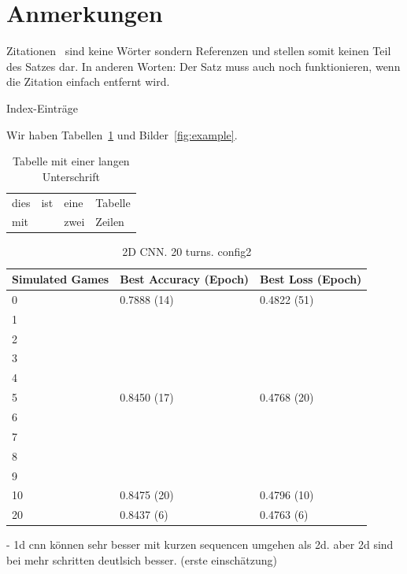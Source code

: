 \lipsum[1-3]

\section{Anmerkungen}
Zitationen~\cite{Rabiner89-ATO} sind keine Wörter sondern Referenzen und stellen somit keinen Teil des Satzes dar. In anderen Worten: Der Satz muss auch noch funktionieren, wenn die Zitation einfach entfernt wird.


Index-Einträge~

Wir haben Tabellen~\ref{tab:example} und Bilder~\ref{fig:example}.

\begin{table}
 \centering
 \begin{tabular}{llll}
  \toprule
  dies & ist & eine & Tabelle \\
  mit  &     & zwei & Zeilen \\
  \bottomrule
 \end{tabular}
 \caption[Tabelle mit kurzer Unterschrift]{Tabelle mit einer langen Unterschrift}
 \label{tab:example}
\end{table}

\begin{table}
	\centering
	\caption{2D CNN. 20 turns. config2}%
	\begin{tabular}{|l|l|l|}
		\hline
		Simulated Games & Best Accuracy (Epoch) & Best Loss (Epoch)\\
		\hline
		0 & 0.7888 (14) & 0.4822 (51) \\
		1 &  &  \\
		2 &  &  \\
		3 &  &  \\
		4 &  &  \\
		5 & 0.8450 (17) & 0.4768 (20) \\
		6 &  &  \\
		7 &  &  \\
		8 &  &  \\
		9 &  &  \\
		10 & 0.8475 (20) & 0.4796 (10) \\
		20 & 0.8437 (6) & 0.4763 (6) \\
		\hline
	\end{tabular}
\end{table}

- 1d cnn können sehr besser mit kurzen sequencen umgehen als 2d. aber 2d sind bei mehr schritten deutlsich besser. (erste einschätzung) 

